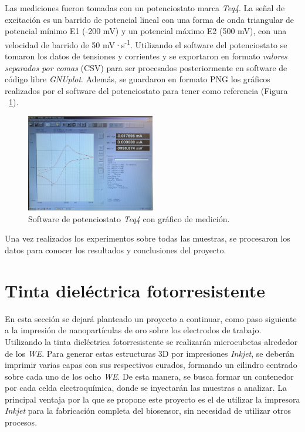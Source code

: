 Las mediciones fueron tomadas con un potenciostato marca \textit{Teq4}. La señal de excitación es un barrido de potencial lineal con una forma de onda triangular de potencial mínimo E1 (-200 mV) y un potencial máximo E2 (500 mV), con una velocidad de barrido de 50 mV·s\textsuperscript{-1}. Utilizando el software del potenciostato se tomaron los datos de tensiones y corrientes y se exportaron en formato \textit{valores separados por comas} (CSV) para ser procesados posteriormente en software de código libre \textit{GNUplot}. Además, se guardaron en formato PNG los gráficos realizados por el software del potenciostato para tener como referencia (Figura ~\ref{fig:Figura_software_potenciostato}).

\begin{figure}[H]
  \centering
    \includegraphics[width=0.5\textwidth]{Figuras/Figura_software_potenciostato}
  \caption{Software de potenciostato \textit{Teq4} con gráfico de medición.}
  \label{fig:Figura_software_potenciostato}
\end{figure}

Una vez realizados los experimentos sobre todas las muestras, se procesaron los datos para conocer los resultados y conclusiones del proyecto.

\section{Tinta dieléctrica fotorresistente}\label{sec:tinta_dielec}
En esta sección se dejará planteado un proyecto a continuar, como paso siguiente a la impresión de nanopartículas de oro sobre los electrodos de trabajo. Utilizando la tinta dieléctrica fotorresistente se realizarán microcubetas alrededor de los \emph{WE}. Para generar estas estructuras 3D por impresiones \textit{Inkjet}, se deberán imprimir varias capas con sus respectivos curados, formando un cilindro centrado sobre cada uno de los ocho \emph{WE}. De esta manera, se busca formar un contenedor por cada celda electroquímica, donde se inyectarán las muestras a analizar. La principal ventaja por la que se propone este proyecto es el de utilizar la impresora \textit{Inkjet} para la fabricación completa del biosensor, sin necesidad de utilizar otros procesos.

